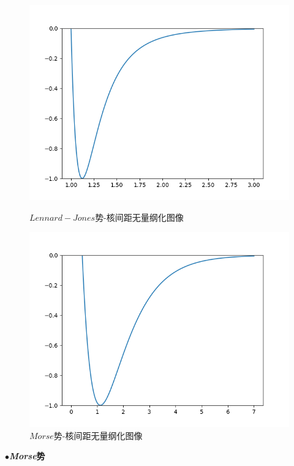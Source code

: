 \documentclass[11pt, a4paper, oneside]{ctexart}
\begin{document}
{{\begin{center}
        \begin{figure}[ht]\vspace{-2mm}
            \begin{minipage}[t]{0.5\linewidth}
            \centering
            \includegraphics[scale=0.5]{1.png}\vspace{-6mm}
            \caption{\small{ $Lennard-Jones$势-核间距无量纲化图像}}
            \end{minipage}%
            \begin{minipage}[t]{0.5\linewidth}
            \centering
            \includegraphics[scale=0.5]{2.png}\vspace{-6mm}
            \caption{\small{ $Morse$势-核间距无量纲化图像}}
            \end{minipage}
        \end{figure}
    \end{center}    
}
\vspace{-8mm}
$\bullet${\bfseries{\emph{Morse}势}}


}
\end{document}
